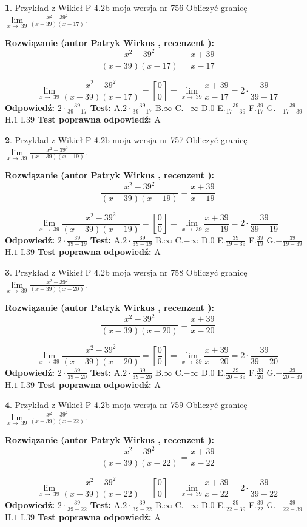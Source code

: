 \documentclass[12pt, a4paper]{article}
\theoremstyle{definition} %
\newtheorem{zad}{}
\newcommand{\zadStart}[1]{\begin{zad}#1\newline}
\newcommand{\zadStop}{\end{zad}}
\newcommand{\rozwStart}[2]{\noindent \textbf{Rozwiązanie (autor #1 , recenzent #2): }\newline}
\newcommand{\rozwStop}{\newline}
\newcommand{\odpStart}{\noindent \textbf{Odpowiedź:}\newline}
\newcommand{\odpStop}{\newline}
\newcommand{\testStart}{\noindent \textbf{Test:}\newline}
\newcommand{\testStop}{\newline}
\newcommand{\kluczStart}{\noindent \textbf{Test poprawna odpowiedź:}\newline}
\newcommand{\kluczStop}{\newline}
\begin{document}
\zadStart{Przykład z Wikieł P 4.2b moja wersja nr 756}
Obliczyć granicę $\lim\limits_{x\to\ 39}\frac{x^{2}-39^{2}}{(x-39)(x-17)}$.
\zadStop
\rozwStart{Patryk Wirkus}{}
$$\frac{x^{2}-39^{2}}{(x-39)(x-17)}=\frac{x+39}{x-17}$$

$$\lim\limits_{x\to\ 39}\frac{x^{2}-39^{2}}{(x-39)(x-17)}=[\frac{0}{0}]=\lim\limits_{x\to\ 39}\frac{x+39}{x-17}=2 \cdot \frac{39}{39-17}$$
\rozwStop
\odpStart
$2 \cdot \frac{39}{39-17}$
\odpStop
\testStart
A.$2 \cdot \frac{39}{39-17}$
B.$\infty$
C.$-\infty$
D.$0$
E.$\frac{39}{17-39}$
F.$\frac{39}{17}$
G.$-\frac{39}{17-39}$
H.$1$
I.$39$
\testStop
\kluczStart
A
\kluczStop



\zadStart{Przykład z Wikieł P 4.2b moja wersja nr 757}
Obliczyć granicę $\lim\limits_{x\to\ 39}\frac{x^{2}-39^{2}}{(x-39)(x-19)}$.
\zadStop
\rozwStart{Patryk Wirkus}{}
$$\frac{x^{2}-39^{2}}{(x-39)(x-19)}=\frac{x+39}{x-19}$$

$$\lim\limits_{x\to\ 39}\frac{x^{2}-39^{2}}{(x-39)(x-19)}=[\frac{0}{0}]=\lim\limits_{x\to\ 39}\frac{x+39}{x-19}=2 \cdot \frac{39}{39-19}$$
\rozwStop
\odpStart
$2 \cdot \frac{39}{39-19}$
\odpStop
\testStart
A.$2 \cdot \frac{39}{39-19}$
B.$\infty$
C.$-\infty$
D.$0$
E.$\frac{39}{19-39}$
F.$\frac{39}{19}$
G.$-\frac{39}{19-39}$
H.$1$
I.$39$
\testStop
\kluczStart
A
\kluczStop



\zadStart{Przykład z Wikieł P 4.2b moja wersja nr 758}
Obliczyć granicę $\lim\limits_{x\to\ 39}\frac{x^{2}-39^{2}}{(x-39)(x-20)}$.
\zadStop
\rozwStart{Patryk Wirkus}{}
$$\frac{x^{2}-39^{2}}{(x-39)(x-20)}=\frac{x+39}{x-20}$$

$$\lim\limits_{x\to\ 39}\frac{x^{2}-39^{2}}{(x-39)(x-20)}=[\frac{0}{0}]=\lim\limits_{x\to\ 39}\frac{x+39}{x-20}=2 \cdot \frac{39}{39-20}$$
\rozwStop
\odpStart
$2 \cdot \frac{39}{39-20}$
\odpStop
\testStart
A.$2 \cdot \frac{39}{39-20}$
B.$\infty$
C.$-\infty$
D.$0$
E.$\frac{39}{20-39}$
F.$\frac{39}{20}$
G.$-\frac{39}{20-39}$
H.$1$
I.$39$
\testStop
\kluczStart
A
\kluczStop



\zadStart{Przykład z Wikieł P 4.2b moja wersja nr 759}
Obliczyć granicę $\lim\limits_{x\to\ 39}\frac{x^{2}-39^{2}}{(x-39)(x-22)}$.
\zadStop
\rozwStart{Patryk Wirkus}{}
$$\frac{x^{2}-39^{2}}{(x-39)(x-22)}=\frac{x+39}{x-22}$$

$$\lim\limits_{x\to\ 39}\frac{x^{2}-39^{2}}{(x-39)(x-22)}=[\frac{0}{0}]=\lim\limits_{x\to\ 39}\frac{x+39}{x-22}=2 \cdot \frac{39}{39-22}$$
\rozwStop
\odpStart
$2 \cdot \frac{39}{39-22}$
\odpStop
\testStart
A.$2 \cdot \frac{39}{39-22}$
B.$\infty$
C.$-\infty$
D.$0$
E.$\frac{39}{22-39}$
F.$\frac{39}{22}$
G.$-\frac{39}{22-39}$
H.$1$
I.$39$
\testStop
\kluczStart
A
\kluczStop
\end{document}
